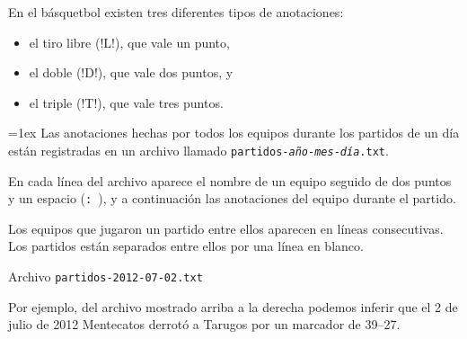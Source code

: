 En el básquetbol existen tres diferentes tipos de anotaciones:
\begin{itemize}
  \item el tiro libre (\li!L!), que vale un punto,
  \item el doble (\li!D!), que vale dos puntos, y
  \item el triple (\li!T!), que vale tres puntos.
\end{itemize}

\begin{minipage}[t]{0.52\textwidth}
  \parskip=1ex
  Las anotaciones hechas por todos los equipos
  durante los partidos de un día
  están registradas en un archivo
  llamado \texttt{partidos-\textit{año}-\textit{mes}-\textit{día}.txt}.

  En cada línea del archivo aparece el nombre de un equipo
  seguido de dos puntos y un espacio (\verb+: +),
  y a continuación las anotaciones del equipo durante el partido.

  Los equipos que jugaron un partido entre ellos
  aparecen en líneas consecutivas.
  Los partidos están separados entre ellos
  por una línea en blanco.

\end{minipage}
\hfill
\begin{minipage}[t]{0.43\textwidth}
  \centering
  Archivo \verb+partidos-2012-07-02.txt+
  \small
  
\end{minipage}

Por ejemplo,
del archivo mostrado arriba a la derecha
podemos inferir que el 2 de julio de 2012
Mentecatos derrotó a Tarugos por un marcador de 39--27.

